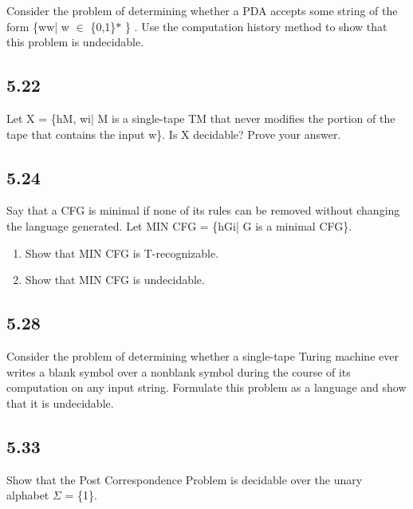 Consider the problem of determining whether a PDA accepts some string of the form \{ww| w $\in$ \{0,1\}$\ast$ \} . Use the computation history method to show that this problem is undecidable.


\subsection*{5.22}

Let X = \{hM, wi| M is a single-tape TM that never modifies the portion of the tape that contains the input w\}. Is X decidable? Prove your answer.


\subsection*{5.24}

Say that a CFG is minimal if none of its rules can be removed without changing the language generated. Let MIN CFG = \{hGi| G is a minimal CFG\}.

\begin{enumerate}[label=(\alph*), leftmargin=2.5em]

\item Show that MIN CFG is T-recognizable.

\item Show that MIN CFG is undecidable.

\end{enumerate}


\subsection*{5.28}

Consider the problem of determining whether a single-tape Turing machine ever writes a blank symbol over a nonblank symbol during the course of its computation on any input string. Formulate this problem as a language and show that it is undecidable.


\subsection*{5.33}

Show that the Post Correspondence Problem is decidable over the unary alphabet $\Sigma$ = \{1\}.


\clearpage
